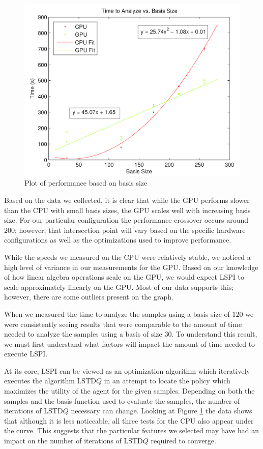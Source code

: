 \begin{figure}
    \includegraphics[width=\textwidth]{Time_vs_Basis.png}
    \caption{Plot of performance based on basis size}
    \label{fig:basis}
\end{figure}

Based on the data we collected, it is clear that while the GPU performs slower than the CPU with small basis sizes, the GPU scales well with increasing basis size. For our particular configuration the performance crossover occurs around $200$; however, that intersection point will vary based on the specific hardware configurations as well as the optimizations used to improve performance.

While the speeds we measured on the CPU were relatively stable, we noticed a high level of variance in our measurements for the GPU. Based on our knowledge of how linear algebra operations scale on the GPU, we would expect LSPI to scale approximately linearly on the GPU. Most of our data supports this; however, there are some outliers present on the graph.

When we measured the time to analyze the samples using a basis size of $120$ we were consistently seeing results that were comparable to the amount of time needed to analyze the samples using a basis of size $30$. To understand this result, we must first understand what factors will impact the amount of time needed to execute LSPI.

At its core, LSPI can be viewed as an optimization algorithm which iteratively executes the algorithm LSTD$Q$ in an attempt to locate the policy which maximizes the utility of the agent for the given samples. Depending on both the samples and the basis function used to evaluate the samples, the number of iterations of LSTD$Q$ necessary can change. Looking at Figure \ref{fig:basis} the data shows that although it is less noticeable, all three tests for the CPU also appear under the curve. This suggests that the particular features we selected may have had an impact on the number of iterations of LSTD$Q$ required to converge.

